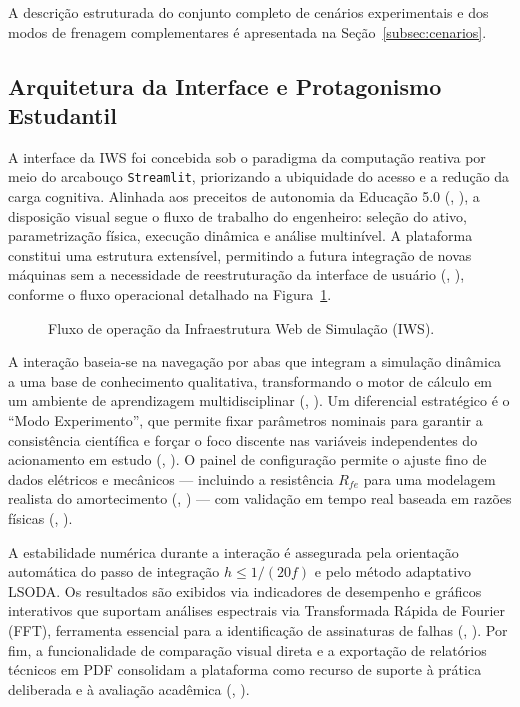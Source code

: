\documentclass[a4paper]{ifacconf}
\begin{document}
A descrição estruturada do conjunto completo de cenários experimentais e dos modos de frenagem complementares é apresentada na Seção~\ref{subsec:cenarios}.

\subsection{Arquitetura da Interface e Protagonismo Estudantil}

A interface da IWS foi concebida sob o paradigma da computação reativa por meio do arcabouço \texttt{Streamlit}, priorizando a ubiquidade do acesso e a redução da carga cognitiva. Alinhada aos preceitos de autonomia da Educação 5.0 (\citeauthor{cordeiro2024educacao}, \citeyear{cordeiro2024educacao}), a disposição visual segue o fluxo de trabalho do engenheiro: seleção do ativo, parametrização física, execução dinâmica e análise multinível. A plataforma constitui uma estrutura extensível, permitindo a futura integração de novas máquinas sem a necessidade de reestruturação da interface de usuário (\citeauthor{leedy2013simulink}, \citeyear{leedy2013simulink}), conforme o fluxo operacional detalhado na Figura~\ref{fig:fluxo_ems}.

\begin{figure}[htbp]
  \centering
  \resizebox{0.48\textwidth}{!}{
    
  }
  \caption{Fluxo de operação da Infraestrutura Web de Simulação (IWS).}
  \label{fig:fluxo_ems}
\end{figure}

A interação baseia-se na navegação por abas que integram a simulação dinâmica a uma base de conhecimento qualitativa, transformando o motor de cálculo em um ambiente de aprendizagem multidisciplinar (\citeauthor{souza2011ambiente}, \citeyear{souza2011ambiente}). Um diferencial estratégico é o ``Modo Experimento'', que permite fixar parâmetros nominais para garantir a consistência científica e forçar o foco discente nas variáveis independentes do acionamento em estudo (\citeauthor{tuanmohamad2024advance}, \citeyear{tuanmohamad2024advance}). O painel de configuração permite o ajuste fino de dados elétricos e mecânicos --- incluindo a resistência $R_{fe}$ para uma modelagem realista do amortecimento (\citeauthor{kumari2025comparative}, \citeyear{kumari2025comparative}) --- com validação em tempo real baseada em razões físicas (\citeauthor{karakas2009aggregation}, \citeyear{karakas2009aggregation}).

A estabilidade numérica durante a interação é assegurada pela orientação automática do passo de integração $h \leq 1/(20f)$ e pelo método adaptativo LSODA. Os resultados são exibidos via indicadores de desempenho e gráficos interativos que suportam análises espectrais via Transformada Rápida de Fourier (FFT), ferramenta essencial para a identificação de assinaturas de falhas (\citeauthor{arkan2005modelling}, \citeyear{arkan2005modelling}). Por fim, a funcionalidade de comparação visual direta e a exportação de relatórios técnicos em PDF consolidam a plataforma como recurso de suporte à prática deliberada e à avaliação acadêmica (\citeauthor{singh2019improving}, \citeyear{singh2019improving}).
\end{document}
